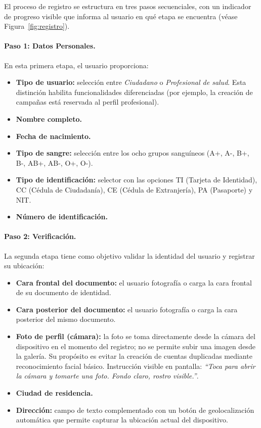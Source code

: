 El proceso de registro se estructura en tres pasos secuenciales, con un indicador de progreso visible que informa al usuario en qué etapa se encuentra (véase Figura~\ref{fig:registro}).

\paragraph{Paso 1: Datos Personales.}
En esta primera etapa, el usuario proporciona:

\begin{itemize}
    \item \textbf{Tipo de usuario:} selección entre \textit{Ciudadano} o \textit{Profesional de salud}. Esta distinción habilita funcionalidades diferenciadas (por ejemplo, la creación de campañas está reservada al perfil profesional).
    \item \textbf{Nombre completo.}
    \item \textbf{Fecha de nacimiento.}
    \item \textbf{Tipo de sangre:} selección entre los ocho grupos sanguíneos (A+, A-, B+, B-, AB+, AB-, O+, O-).
    \item \textbf{Tipo de identificación:} selector con las opciones TI (Tarjeta de Identidad), CC (Cédula de Ciudadanía), CE (Cédula de Extranjería), PA (Pasaporte) y NIT.
    \item \textbf{Número de identificación.}
\end{itemize}

\paragraph{Paso 2: Verificación.}
La segunda etapa tiene como objetivo validar la identidad del usuario y registrar su ubicación:

\begin{itemize}
    \item \textbf{Cara frontal del documento:} el usuario fotografía o carga la cara frontal de su documento de identidad.
    \item \textbf{Cara posterior del documento:} el usuario fotografía o carga la cara posterior del mismo documento.
    \item \textbf{Foto de perfil (cámara):} la foto se toma directamente desde la cámara del dispositivo en el momento del registro; no se permite subir una imagen desde la galería. Su propósito es evitar la creación de cuentas duplicadas mediante reconocimiento facial básico. Instrucción visible en pantalla: \textit{``Toca para abrir la cámara y tomarte una foto. Fondo claro, rostro visible.''}.
    \item \textbf{Ciudad de residencia.}
    \item \textbf{Dirección:} campo de texto complementado con un botón de geolocalización automática que permite capturar la ubicación actual del dispositivo.
\end{itemize}


